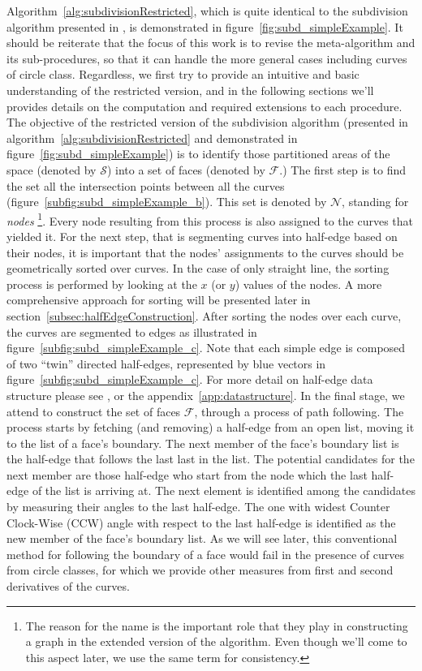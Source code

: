 Algorithm~\ref{alg:subdivisionRestricted}, which is quite identical to the subdivision algorithm presented in \cite{de2000computational}, is demonstrated in figure~\ref{fig:subd_simpleExample}.
It should be reiterate that the focus of this work is to revise the meta-algorithm and its sub-procedures, so that it can handle the more general cases including curves of circle class.
Regardless, we first try to provide an intuitive and basic understanding of the restricted version, and in the following sections we'll provides details on the computation and required extensions to each procedure.
The objective of the restricted version of the subdivision algorithm (presented in algorithm~\ref{alg:subdivisionRestricted} and demonstrated in figure~\ref{fig:subd_simpleExample}) is to identify those partitioned areas of the space (denoted by $\mathcal{S}$) into a set of faces (denoted by $\mathcal{F}$.)
The first step is to find the set all the intersection points between all the curves (figure~\ref{subfig:subd_simpleExample_b}).
This set is denoted by $\mathcal{N}$, standing for \emph{nodes} \footnote{The reason for the name is the important role that they play in constructing a graph in the extended version of the algorithm. Even though we'll come to this aspect later, we use the same term for consistency.}.
Every node resulting from this process is also assigned to the curves that yielded it.
For the next step, that is segmenting curves into half-edge based on their nodes, it is important that the nodes' assignments to the curves should be geometrically sorted over curves.
In the case of only straight line, the sorting process is performed by looking at the $x$ (or $y$) values of the nodes.
A more comprehensive approach for sorting will be presented later in section~\ref{subsec:halfEdgeConstruction}.
After sorting the nodes over each curve, the curves are segmented to edges as illustrated in figure~\ref{subfig:subd_simpleExample_c}.
Note that each simple edge is composed of two ``twin'' directed half-edges, represented by blue vectors in figure~\ref{subfig:subd_simpleExample_c}.
For more detail on half-edge data structure please see \cite{de2000computational}, or the appendix~\ref{app:datastructure}.
In the final stage, we attend to construct the set of faces $\mathcal{F}$, through a process of path following.
The process starts by fetching (and removing) a half-edge from an open list, moving it to the list
of a face's boundary.
The next member of the face's boundary list is the half-edge that follows the last last in the list.
The potential candidates for the next member are those half-edge who start from the node which the last half-edge of the list is arriving at.
The next element is identified among the candidates by measuring their angles to the last half-edge.
The one with widest Counter Clock-Wise (CCW) angle with respect to the last half-edge is identified as the new member of the face's boundary list.
As we will see later, this conventional method for following the boundary of a face would fail in the presence of curves from circle classes, for which we provide other measures from first and second derivatives of the curves.


